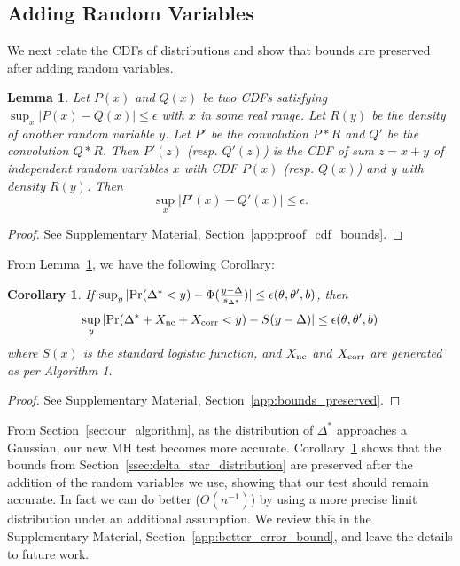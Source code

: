 \documentclass[twoside]{article} \usepackage{aistats2017}
\newtheorem{lemma}{Lemma}
\newtheorem{corollary}{Corollary}
\begin{document}
\subsection{Adding Random Variables}\label{ssec:preserve_bounds}

We next relate the CDFs of distributions and show that bounds are preserved
after adding random variables.

\begin{lemma}\label{lem:cdf_bounds}
Let $P(x)$ and $Q(x)$ be two CDFs satisfying
$\sup_x|P(x)-Q(x)|\leq \epsilon$ with $x$ in some real range. Let $R(y)$ be the
{\em density} of another random variable $y$. Let $P'$ be the convolution $P*R$
and $Q'$ be the convolution $Q*R$. Then $P'(z)$ (resp. $Q'(z)$) is the CDF of
sum $z=x+y$ of independent random variables $x$ with CDF $P(x)$ (resp. $Q(x)$)
and y with density $R(y)$.  Then
\begin{equation}
    \sup_x|P'(x)-Q'(x)|\leq \epsilon.
\end{equation}
\end{lemma}
\begin{proof}
See Supplementary Material, Section~\ref{app:proof_cdf_bounds}.
\end{proof}

From Lemma~\ref{lem:cdf_bounds}, we have the following Corollary:

\begin{corollary}\label{cor:bounds_preserved}
If $\sup_y|{\rm Pr}(\Delta^* < y) - \Phi(\frac{y-\Delta}{s_{\Delta^*}})|
\leq \epsilon(\theta,\theta',b)$, then
\[
    \sup_y|{\rm Pr}(\Delta^*+X_{\rm nc}+X_{\rm corr} < y) - S(y-\Delta)| \leq \epsilon(\theta,\theta',b)
\]
where $S(x)$ is the standard logistic function, and $X_{\rm nc}$ and $X_{\rm corr}$ are generated as per Algorithm 1. 
\end{corollary}

\begin{proof}
See Supplementary Material, Section~\ref{app:bounds_preserved}.
\end{proof}

From Section~\ref{sec:our_algorithm}, as the distribution of $\Delta^*$
approaches a Gaussian, our new MH test becomes more accurate.
Corollary~\ref{cor:bounds_preserved} shows that the bounds from
Section~\ref{ssec:delta_star_distribution} are preserved after the addition of
the random variables we use, showing that our test should remain accurate.
In fact we can do better ($O(n^{-1})$) by using a more precise limit
distribution under an additional assumption. We review this in the Supplementary
Material, Section~\ref{app:better_error_bound}, and leave the details to future
work.
\end{document}
